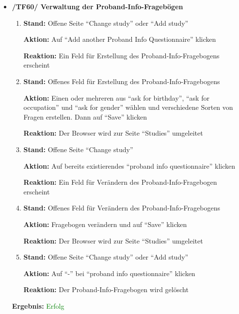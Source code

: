 \documentclass[a4paper]{scrreprt}
\begin{document}
\begin{itemize}
		                      \item \textbf{/TF60/ Verwaltung der Proband-Info-Frageb\"ogen}
		                          \begin{enumerate}
		                              \item \par \textbf{Stand: }Offene Seite ``Change study'' oder ``Add study''
		                                    \par \textbf{Aktion: }Auf ``Add another Proband Info Questionnaire'' klicken
		                                    \par \textbf{Reaktion: }Ein Feld f\"ur Erstellung des Proband-Info-Fragebogens erscheint
		                              \item \par \textbf{Stand: }Offenes Feld f\"ur Erstellung des Proband-Info-Fragebogens
		                                    \par \textbf{Aktion: }Einen oder mehreren aus ``ask for birthday'', ``ask for occupation'' und ``ask for gender'' w\"ahlen und verschiedene Sorten von Fragen erstellen. Dann auf ``Save'' klicken
		                                    \par \textbf{Reaktion: }Der Browser wird zur Seite ``Studies'' umgeleitet   
		                              \item \par \textbf{Stand: }Offene Seite ``Change study''
		                                    \par \textbf{Aktion: }Auf bereits existierendes ``proband info questionnaire'' klicken
		                                    \par \textbf{Reaktion: }Ein Feld f\"ur Ver\"andern des Proband-Info-Fragebogen erscheint  
		                              \item \par \textbf{Stand: }Offenes Feld f\"ur Ver\"andern des Proband-Info-Fragebogens
		                                    \par \textbf{Aktion: }Fragebogen ver\"andern und auf ``Save'' klicken
		                                    \par \textbf{Reaktion: }Der Browser wird zur Seite ``Studies'' umgeleitet               
		                              \item \par \textbf{Stand: }Offene Seite ``Change study'' oder ``Add study''
		                                    \par \textbf{Aktion: }Auf ``-'' bei ``proband info questionnaire'' klicken
		                                    \par \textbf{Reaktion: }Der Proband-Info-Fragebogen wird gel\"oscht                                                                           
		                          \end{enumerate}
		      					\vspace*{0.3cm}
		      		           \par \textbf{Ergebnis: }\textcolor{green}{Erfolg}
		      		           \vspace*{0.6cm}  	
		      		           

\end{itemize}
\end{document}
